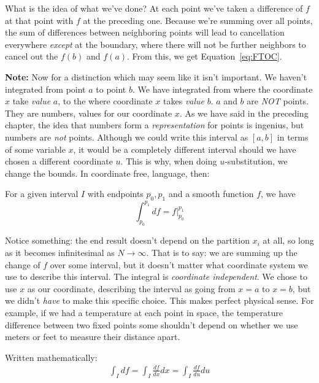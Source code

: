 	What is the idea of what we've done? At each point we've taken a difference of $f$ at that point with $f$ at the preceding one. Because we're summing over all points, the sum of differences between neighboring points will lead to cancellation everywhere \emph{except} at the boundary, where there will not be further neighbors to cancel out the $f(b)$ and $f(a)$. From this, we get Equation~\eqref{eq:FTOC}. 
	
\noindent \textbf{Note:}
	Now for a distinction which may seem like it isn't important. We haven't integrated from point $a$ to point $b$. We have integrated from where the coordinate $x$ take \emph{value} $a$, to the where coordinate $x$ takes \emph{value} $b$. $a$ and $b$ are \emph{NOT} points. They are numbers, values for our coordinate $x$. As we have said in the preceding chapter, the idea that numbers form a \emph{representation} for points is ingenius, but numbers are \emph{not} points. Although we could write this interval as $[a,b]$ in terms of some variable $x$, it would be a completely different interval should we have chosen a different coordinate $u$. This is why, when doing $u$-substitution, we change the bounds. In coordinate free, language, then:

	
	\begin{theorem}\label{thm:FTOC}
		For a given interval $I$ with endpoints $p_0, p_1$ and a smooth function $f$, we have
		\begin{equation}
			  \int_{p_0}^{p_1} df = f \Big\rvert_{p_0}^{p_1} 
		\end{equation}
	\end{theorem}
	Notice something: the end result doesn't depend on the partition $x_i$ at all, so long as it becomes infinitesimal as $N \rightarrow \infty$. That is to say: we are summing up the change of $f$ over some interval, but it doesn't matter what coordinate system we use to describe this interval. The integral is \emph{coordinate independent}. We chose to use $x$ as our coordinate, describing the interval as going from $x=a$ to $x=b$, but we didn't \emph{have} to make this specific choice. This makes perfect physical sense. For example, if we had a temperature at each point in space, the temperature difference between two fixed points some shouldn't depend on whether we use meters or feet to measure their distance apart.  
	
	Written mathematically: 
	\begin{align*}
		\int_I df = \int_I \frac{df}{dx} dx = \int_I \frac{df}{du} du 
	\end{align*}
	
